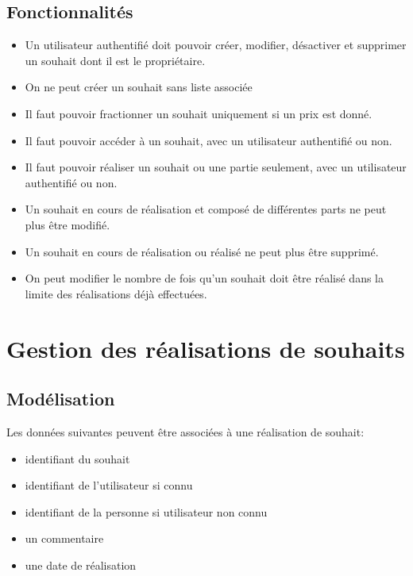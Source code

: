 \documentclass[11pt]{amsbook}
\begin{document}
\hypertarget{x-fonctionnalités}{\subsection{Fonctionnalités}}
\begin{itemize}

\item Un utilisateur authentifié doit pouvoir créer, modifier, désactiver et supprimer un souhait dont il est le propriétaire.

\item On ne peut créer un souhait sans liste associée

\item Il faut pouvoir fractionner un souhait uniquement si un prix est donné.

\item Il faut pouvoir accéder à un souhait, avec un utilisateur authentifié ou non.

\item Il faut pouvoir réaliser un souhait ou une partie seulement, avec un utilisateur authentifié ou non.

\item Un souhait en cours de réalisation et composé de différentes parts ne peut plus être modifié.

\item Un souhait en cours de réalisation ou réalisé ne peut plus être supprimé.

\item On peut modifier le nombre de fois qu’un souhait doit être réalisé dans la limite des réalisations déjà effectuées.

\end{itemize}


\hypertarget{x-gestion-des-réalisations-de-souhaits}{\section{Gestion des réalisations de souhaits}}
\hypertarget{x-modélisation}{\subsection{Modélisation}}
Les données suivantes peuvent être associées à une réalisation de souhait:


\begin{itemize}

\item identifiant du souhait

\item identifiant de l’utilisateur si connu

\item identifiant de la personne si utilisateur non connu

\item un commentaire

\item une date de réalisation

\end{itemize}
\end{document}
